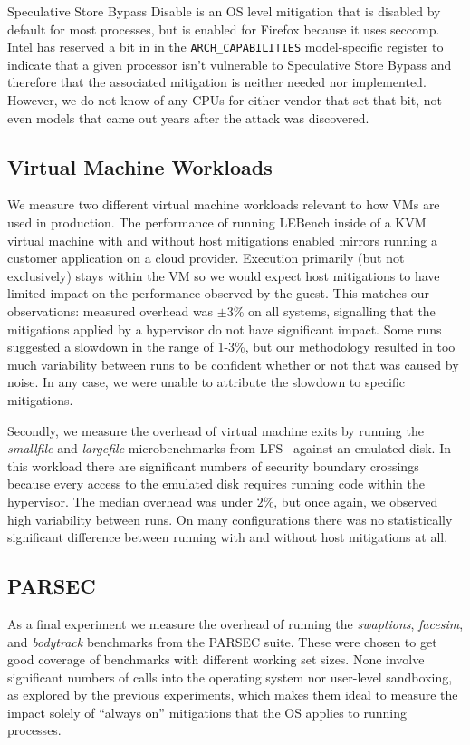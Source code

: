 Speculative Store Bypass Disable is an OS level mitigation that is disabled by default for most processes, but is enabled for Firefox because it uses seccomp.
Intel has reserved a bit in in the \texttt{ARCH\_CAPABILITIES} model-specific register to indicate that a given processor isn't vulnerable to Speculative Store Bypass and therefore that the associated mitigation is neither needed nor implemented.
However, we do not know of any CPUs for either vendor that set that bit, not even models that came out years after the attack was discovered.

\subsection{Virtual Machine Workloads}
\label{sec:benchmarks:vm}

We measure two different virtual machine workloads relevant to how VMs are used in production.
The performance of running LEBench inside of a KVM virtual machine with and without host mitigations enabled mirrors running a customer application on a cloud provider.
Execution primarily (but not exclusively) stays within the VM so we would expect host mitigations to have limited impact on the performance observed by the guest.
This matches our observations: measured overhead was $\pm 3$\% on all systems, signalling that the mitigations applied by a hypervisor do not have significant impact.
Some runs suggested a slowdown in the range of 1-3\%, but our methodology resulted in too much variability between runs to be confident whether or not that was caused by noise. 
In any case, we were unable to attribute the slowdown to specific mitigations.

Secondly, we measure the overhead of virtual machine exits by running the \textit{smallfile} and \textit{largefile} microbenchmarks from LFS~\cite{rosenblum:lfs} against an emulated disk.
In this workload there are significant numbers of security boundary crossings because every access to the emulated disk requires running code within the hypervisor.
The median overhead was under $2$\%, but once again, we observed high variability between runs.
On many configurations there was no statistically significant difference between running with and without host mitigations at all.

\subsection{PARSEC}
\label{sec:benchmarks:parsec}
As a final experiment we measure the overhead of running the \textit{swaptions}, \textit{facesim}, and \textit{bodytrack} benchmarks from the PARSEC suite.
These were chosen to get good coverage of benchmarks with different working set sizes.
None involve significant numbers of calls into the operating system nor user-level sandboxing, as explored by the previous experiments, which makes them ideal to measure the impact solely of ``always on'' mitigations that the OS applies to running processes.

